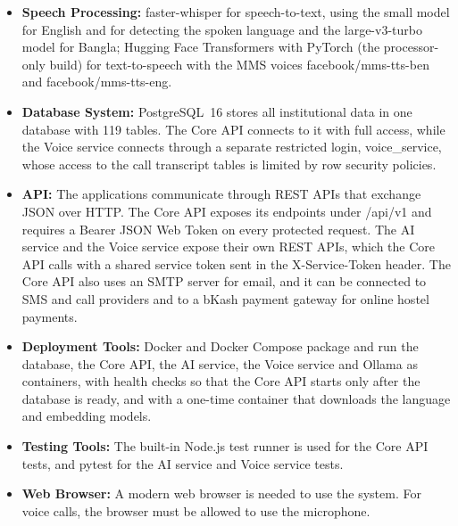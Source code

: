 \begin{itemize}
    \item \textbf{Speech Processing:}
    faster-whisper for speech-to-text, using the small model for English and for detecting the spoken language and the large-v3-turbo model for Bangla; Hugging Face Transformers with PyTorch (the processor-only build) for text-to-speech with the MMS voices facebook/mms-tts-ben and facebook/mms-tts-eng.

    \item \textbf{Database System:}
    PostgreSQL~16 stores all institutional data in one database with 119 tables. The Core API connects to it with full access, while the Voice service connects through a separate restricted login, voice\_service, whose access to the call transcript tables is limited by row security policies.

    \item \textbf{API:}
    The applications communicate through REST APIs that exchange JSON over HTTP. The Core API exposes its endpoints under /api/v1 and requires a Bearer JSON Web Token on every protected request. The AI service and the Voice service expose their own REST APIs, which the Core API calls with a shared service token sent in the X-Service-Token header. The Core API also uses an SMTP server for email, and it can be connected to SMS and call providers and to a bKash payment gateway for online hostel payments.

    \item \textbf{Deployment Tools:}
    Docker and Docker Compose package and run the database, the Core API, the AI service, the Voice service and Ollama as containers, with health checks so that the Core API starts only after the database is ready, and with a one-time container that downloads the language and embedding models.

    \item \textbf{Testing Tools:}
    The built-in Node.js test runner is used for the Core API tests, and pytest for the AI service and Voice service tests.

    \item \textbf{Web Browser:}
    A modern web browser is needed to use the system. For voice calls, the browser must be allowed to use the microphone.
\end{itemize}

